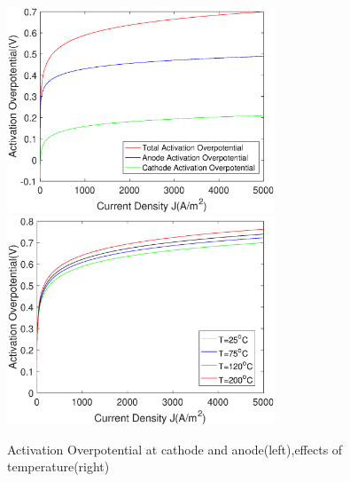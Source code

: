\begin{figure}[h] 
\includegraphics[width=8cm] {Activation.eps} 
\includegraphics[width=8cm]{ActivationT.eps}
\caption{Activation Overpotential at cathode and anode(left),effects of temperature(right)} 
\label{fig:activation}
\end{figure} 


